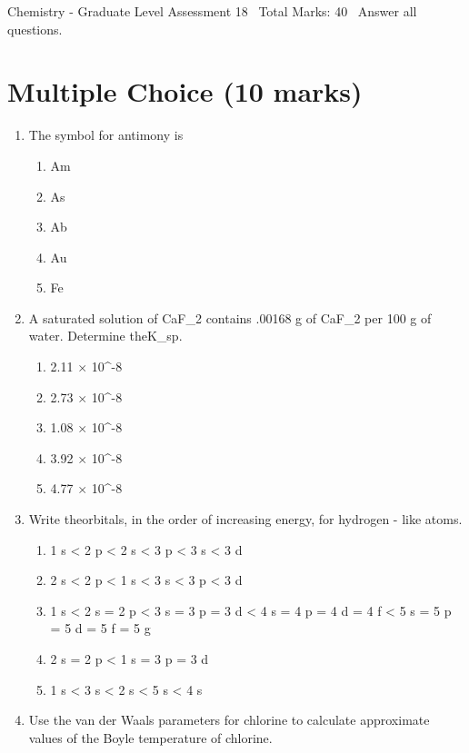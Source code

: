 \documentclass[12pt]{article}
\begin{document}
\begin{center}
Chemistry - Graduate Level Assessment 18 \
Total Marks: 40 \
Answer all questions.
\end{center}

\section*{Multiple Choice (10 marks)}
\begin{enumerate}[label=\arabic*.]
\item The symbol for antimony is
\begin{enumerate}[label=(\alph*)]
    \item Am
    \item As
    \item Ab
    \item Au
    \item Fe
\end{enumerate}
\item A saturated solution of CaF\_2 contains .00168 g of CaF\_2 per 100 g of water. Determine theK\_sp.
\begin{enumerate}[label=(\alph*)]
    \item 2.11 \ensuremath{\times} 10^-8
    \item 2.73 \ensuremath{\times} 10^-8
    \item 1.08 \ensuremath{\times} 10^-8
    \item 3.92 \ensuremath{\times} 10^-8
    \item 4.77 \ensuremath{\times} 10^-8
\end{enumerate}
\item Write theorbitals, in the order of increasing energy, for hydrogen - like atoms.
\begin{enumerate}[label=(\alph*)]
    \item 1 s \textless{} 2 p \textless{} 2 s \textless{} 3 p \textless{} 3 s \textless{} 3 d
    \item 2 s \textless{} 2 p \textless{} 1 s \textless{} 3 s \textless{} 3 p \textless{} 3 d
    \item 1 s \textless{} 2 s = 2 p \textless{} 3 s = 3 p = 3 d \textless{} 4 s = 4 p = 4 d = 4 f \textless{} 5 s = 5 p = 5 d = 5 f = 5 g
    \item 2 s = 2 p \textless{} 1 s = 3 p = 3 d
    \item 1 s \textless{} 3 s \textless{} 2 s \textless{} 5 s \textless{} 4 s
\end{enumerate}
\item Use the van der Waals parameters for chlorine to calculate approximate values of the Boyle temperature of chlorine.

\end{enumerate}
\end{document}
